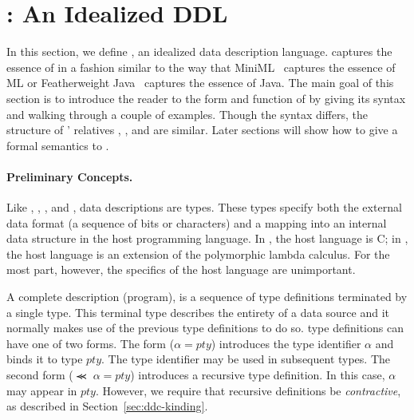 \section{\ipads{}:  An Idealized DDL}
\label{sec:ipads}

In this section, we define \ipads{}, an idealized data description
language.  \ipads{} captures the essence of \pads{} in a fashion
similar to the way that MiniML~\cite{miniml} captures the essence of ML or Featherweight
Java~\cite{igarasi+:featherweight} captures the essence of Java.  The main goal of this section is to introduce
the reader to the form and function of \ipads{} by giving its syntax
and walking through a couple of examples.  Though the syntax differs,
the structure of \pads{}' relatives \blt, \packettypes, and
\datascript{} are similar.  Later sections will show how to give a
formal semantics to \ipads.

\paragraph*{Preliminary Concepts.}
Like \pads, \packettypes, \datascript, and \blt, \ipads{} data
descriptions are types.  These types specify both the external data
format (a sequence of bits or characters) and a mapping into an
internal data structure in the host programming language.  In \pads,
the host language is C; in \ipads, the host language is an extension
of the polymorphic lambda calculus.  For the most part, however, the
specifics of the host language are unimportant.

A complete \ipads{} description (program), is a sequence of type definitions
terminated by a single type.  This terminal type describes the
entirety of a data source and it normally makes use of the previous 
type definitions to do so.  \ipads{} type definitions can have one of
two forms.  The form ($\alpha = pty$) introduces the type identifier
$\alpha$ and binds it to \ipads{} type $pty$.
The type identifier may be used in
subsequent types.  The second form  ($\Prec{}\; \alpha = pty$) introduces
a recursive type definition.  In this case, $\alpha$ may appear in $pty$.
However, we require that recursive definitions be {\it contractive},
as described in Section~\ref{sec:ddc-kinding}.

